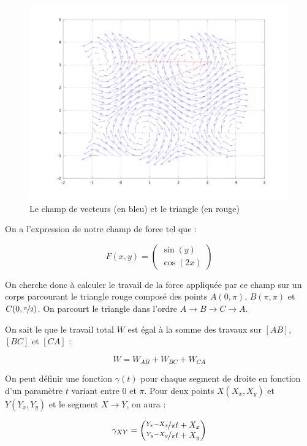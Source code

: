 \documentclass[a4paper, 11pt]{report} %
\begin{document}
\begin{figure}[!h]
    \includegraphics[width=15cm]{exo4.png}
    \caption{\label{fig_exo4} Le champ de vecteurs (en bleu) et le triangle (en rouge)}
\end{figure}

On a l'expression de notre champ de force tel que :

\[
F(x, y) =
\begin{pmatrix}
\sin(y)\\
\cos(2x)
\end{pmatrix}
\]

On cherche donc à calculer le travail de la force appliquée par ce champ sur un corps parcourant le triangle rouge
composé des points $A(0, \pi)$, $B(\pi,\pi)$ et $C(0,\nicefrac{\pi}{2})$. On parcourt le triangle dans l'ordre $A
\rightarrow B \rightarrow C \rightarrow A$.

On sait le que le travail total $W$ est égal à la somme des travaux sur $[AB]$, $[BC]$ et $[CA]$ :

\[ W = W_{AB} + W_{BC} + W_{CA} \]

On peut définir une fonction $\gamma(t)$ pour chaque segment de droite en fonction d'un paramètre $t$ variant entre $0$
et $\pi$. Pour deux points $X(X_x, X_y)$ et $Y(Y_x, Y_y)$ et le segment $X \rightarrow Y$, on aura :

\[
\gamma_{XY} =
\begin{pmatrix}
\nicefrac{Y_x - X_x}{\pi}t+X_x\\
\nicefrac{Y_y - X_y}{\pi}t+X_y
\end{pmatrix}
\]
\end{document}
